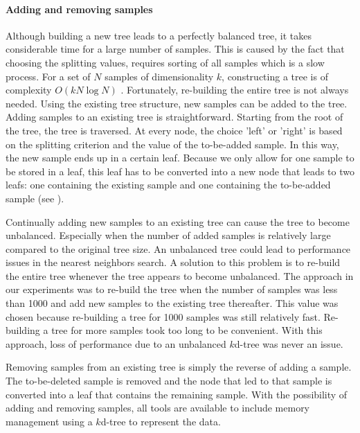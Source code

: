 \paragraph{Adding and removing samples}
Although building a new tree leads to a perfectly balanced tree, it takes considerable time for a large number of samples. This is caused by the fact that choosing the splitting values, requires sorting of all samples which is a slow process. For a set of $N$ samples of dimensionality $k$, constructing a tree is of complexity $O(kN\log{N})$ \cite{Berg:00}. Fortunately, re-building the entire tree is not always needed. Using the existing tree structure, new samples can be added to the tree. Adding samples to an existing tree is straightforward. Starting from the root of the tree, the tree is traversed. At every node, the choice 'left' or 'right' is based on the splitting criterion and the value of the to-be-added sample. In this way, the new sample ends up in a certain leaf. Because we only allow for one sample to be stored in a leaf, this leaf has to be converted into a new node that leads to two leafs: one containing the existing sample and one containing the to-be-added sample (see ).

Continually adding new samples to an existing tree can cause the tree to become unbalanced. Especially when the number of added samples is relatively large compared to the original tree size. An unbalanced tree could lead to performance issues in the nearest neighbors search. A solution to this problem is to re-build the entire tree whenever the tree appears to become unbalanced. The approach in our experiments was to re-build the tree when the number of samples was less than 1000 and add new samples to the existing tree thereafter. This value was chosen because re-building a tree for 1000 samples was still relatively fast. Re-building a tree for more samples took too long to be convenient. With this approach, loss of performance due to an unbalanced $k$d-tree was never an issue.

Removing samples from an existing tree is simply the reverse of adding a sample. The to-be-deleted sample is removed and the node that led to that sample is converted into a leaf that contains the remaining sample. With the possibility of adding and removing samples, all tools are available to include memory management using a $k$d-tree to represent the data.

